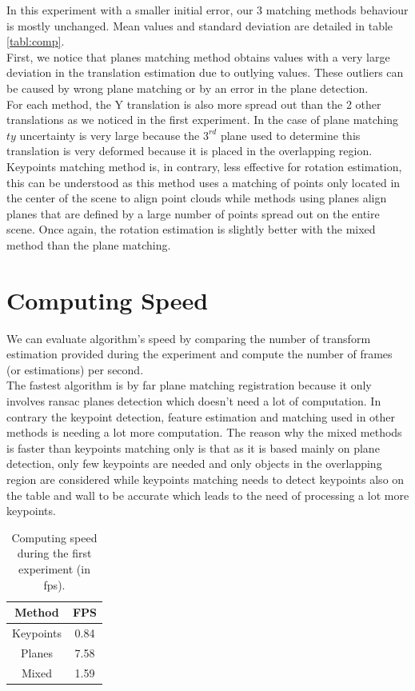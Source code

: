 In this experiment with a smaller initial error, our 3 matching methods behaviour is mostly unchanged. Mean values and standard deviation are detailed in table \ref{tabl:comp}.\\
First, we notice that planes matching method obtains values with a very large deviation in the translation estimation due to outlying values. These outliers can be caused by wrong plane matching or by an error in the plane detection. \\
For each method, the Y translation is also more spread out than the 2 other translations as we noticed in the first experiment. In the case of plane matching $ty$ uncertainty is very large because the $3^{rd}$ plane used to determine this translation is very deformed because it is placed in the overlapping region.\\
Keypoints matching method is, in contrary, less effective for rotation estimation, this can be understood as this method uses a matching of points only located in the center of the scene to align point clouds while methods using planes align planes that are defined by a large number of points spread out on the entire scene. Once again, the rotation estimation is slightly better with the mixed method than the plane matching.

\section{Computing Speed}

We can evaluate algorithm's speed by comparing the number of transform estimation provided during the experiment and compute the number of frames (or estimations) per second. \\
The fastest algorithm is by far plane matching registration because it only involves \acrshort{ransac} planes detection which doesn't need a lot of computation. In contrary the keypoint detection, feature estimation and matching used in other methods is needing a lot more computation. The reason why the mixed methods is faster than keypoints matching only is that as it is based mainly on plane detection, only few keypoints are needed and only objects in the overlapping region are considered while keypoints matching needs to detect keypoints also on the table and wall to be accurate which leads to the need of processing a lot more keypoints.

\begin{table}[h]
    \def\arraystretch{2}
    \centering
    \begin{tabular}{|c|c|}
    \hline
    Method          & FPS  \\ \hline
    Keypoints       & 0.84 \\ \hline
    Planes          & 7.58 \\ \hline
    Mixed           & 1.59 \\ \hline
    \end{tabular}
    \caption{Computing speed during the first experiment (in \acrshort{fps}).}
    \label{tabl:speed}
\end{table}


